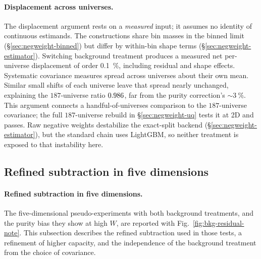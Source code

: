 \paragraph{Displacement across universes.} The displacement argument rests on a \emph{measured} input; it assumes no identity of continuous estimands. The constructions share bin masses in the binned limit (\S\ref{sec:negweight-binned}) but differ by within-bin shape terms (\S\ref{sec:negweight-estimator}). Switching background treatment produces a measured net per-universe displacement of order \SI{0.1}{\percent}, including residual and shape effects. Systematic covariance measures spread across universes about their own mean. Similar small shifts of each universe leave that spread nearly unchanged, explaining the $187$-universe ratio $0.986$, far from the purity correction's ${\sim}\SI{3}{\percent}$. This argument connects a handful-of-universes comparison to the $187$-universe covariance; the full $187$-universe rebuild in \S\ref{sec:negweight-uq} tests it at 2D and passes. Raw negative weights destabilize the exact-split backend (\S\ref{sec:negweight-estimator}), but the standard chain uses LightGBM, so neither treatment is exposed to that instability here.

\subsection{Refined subtraction in five dimensions}\label{recsec:negweight-refined}

\paragraph{Refined subtraction in five dimensions.} The five-dimensional pseudo-experiments with both background treatments, and the purity bias they show at high $W$, are reported with Fig.~\ref{fig:bkg-residual-note}. This subsection describes the refined subtraction used in those tests, a refinement of higher capacity, and the independence of the background treatment from the choice of covariance.

